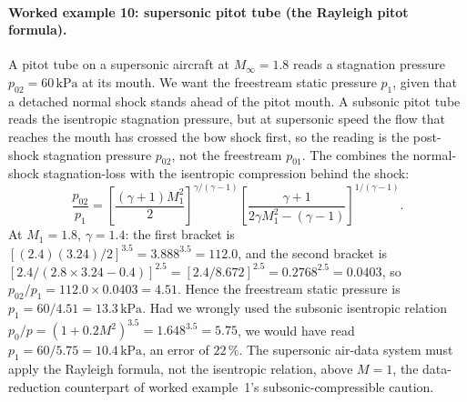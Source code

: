 \paragraph{Worked example 10: supersonic pitot tube (the Rayleigh
pitot formula).} A pitot tube on a supersonic aircraft at
$M_\infty = 1.8$ reads a stagnation pressure
$p_{02} = 60\,\text{kPa}$ at its mouth. We want the freestream static
pressure $p_1$, given that a detached normal shock stands ahead of the
pitot mouth. A subsonic pitot tube reads the isentropic stagnation
pressure, but at supersonic speed the flow that reaches the mouth has
crossed the bow shock first, so the reading is the post-shock
stagnation pressure $p_{02}$, not the freestream $p_{01}$. The
 combines the normal-shock
stagnation-loss with the isentropic compression behind the shock:
\[
\frac{p_{02}}{p_1} = \left[\frac{(\gamma + 1)M_1^2}{2}\right]^{
\gamma/(\gamma - 1)}\left[\frac{\gamma + 1}{2\gamma M_1^2 -
(\gamma - 1)}\right]^{1/(\gamma - 1)}.
\]
At $M_1 = 1.8$, $\gamma = 1.4$: the first bracket is
$[(2.4)(3.24)/2]^{3.5} = 3.888^{3.5} = 112.0$, and the second bracket
is $[2.4/(2.8 \times 3.24 - 0.4)]^{2.5} =
[2.4/8.672]^{2.5} = 0.2768^{2.5} = 0.0403$, so
$p_{02}/p_1 = 112.0 \times 0.0403 = 4.51$. Hence the freestream static
pressure is $p_1 = 60/4.51 = 13.3\,\text{kPa}$. Had we wrongly used the
subsonic isentropic relation $p_{0}/p = (1 + 0.2 M^2)^{3.5} =
1.648^{3.5} = 5.75$, we would have read $p_1 = 60/5.75 =
10.4\,\text{kPa}$, an error of $22\,\%$. The supersonic air-data system
must apply the Rayleigh formula, not the isentropic relation, above
$M = 1$, the data-reduction counterpart of worked example~1's
subsonic-compressible caution.

